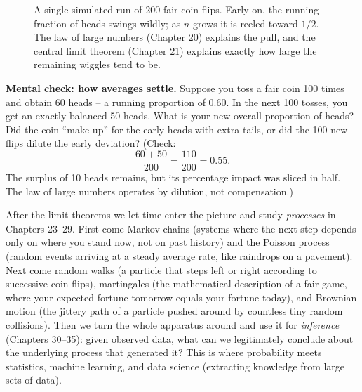 \begin{figure}[H]
\centering
{}
\caption{A single simulated run of 200 fair coin flips. Early on, the running
fraction of heads swings wildly; as $n$ grows it is reeled toward $1/2$. The law
of large numbers (Chapter 20) explains the pull, and the central limit theorem
(Chapter 21) explains exactly how large the remaining wiggles tend to be.}
\label{ch00:lln-preview}
\end{figure}

\begin{recoverybox}
\textbf{Mental check: how averages settle.} Suppose you toss a fair coin 100 times and obtain 60 heads -- a running proportion of $0.60$. In the next 100 tosses, you get an exactly balanced 50 heads. What is your new overall proportion of heads? Did the coin ``make up'' for the early heads with extra tails, or did the 100 new flips dilute the early deviation? (Check:
\[
  \frac{60 + 50}{200} = \frac{110}{200} = 0.55.
\]
The surplus of 10 heads remains, but its percentage impact was sliced in half. The law of large numbers operates by dilution, not compensation.)
\end{recoverybox}

After the limit theorems we let time enter the picture and study
\emph{processes} in Chapters 23--29. First come Markov chains (systems where the
next step depends only on where you stand now, not on past history) and the
Poisson process (random events arriving at a steady average rate, like raindrops
on a pavement). Next come random walks (a particle that steps left or right
according to successive coin flips), martingales (the mathematical description
of a fair game, where your expected fortune tomorrow equals your fortune today),
and Brownian motion (the jittery path of a particle pushed around by countless
tiny random collisions).
Then we turn the whole apparatus around and use it for \emph{inference} (Chapters
30--35): given observed data, what can we legitimately conclude about the
underlying process that generated it? This is where probability meets statistics,
machine learning, and data science (extracting knowledge from large sets of data).

